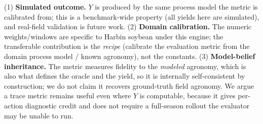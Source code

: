 \documentclass[11pt]{article}
\begin{document}
(1) \textbf{Simulated outcome.} $Y$ is produced by the same process model the
metric is calibrated from; this is a benchmark-wide property (all yields here are
simulated), and real-field validation is future work. (2) \textbf{Domain
calibration.} The numeric weights/windows are specific to Harbin soybean under
this engine; the transferable contribution is the \emph{recipe} (calibrate the
evaluation metric from the domain process model / known agronomy), not the
constants. (3) \textbf{Model-belief inheritance.} The metric measures fidelity
to the \emph{modeled} agronomy, which is also what defines the oracle and the
yield, so it is internally self-consistent by construction; we do not claim it
recovers ground-truth field agronomy. We argue a trace metric remains useful
even where $Y$ is computable, because it gives per-action diagnostic credit and
does not require a full-season rollout the evaluator may be unable to run.
\end{document}
